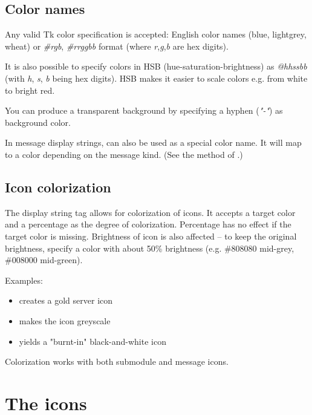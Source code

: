 \subsection{Color names}

Any valid Tk color specification is accepted: English color names
(blue, lightgrey, wheat) or \textit{\#rgb}, \textit{\#rrggbb} format
(where \textit{r},\textit{g},\textit{b} are hex digits).

It is also possible to specify colors in HSB (hue-saturation-brightness) as
\textit{@hhssbb} (with \textit{h}, \textit{s}, \textit{b} being hex digits).
HSB makes it easier to scale colors e.g. from white to bright red.

You can produce a transparent background by specifying a hyphen (\textit{"-"})
as background color.

In message display strings,  can also be used as a special color name.
It will map to a color depending on the message kind.
(See the  method of .)

\subsection{Icon colorization}

The  display string tag allows for colorization of icons.
It accepts a target color and a percentage as the degree of colorization.
Percentage has no effect if the target color is missing.
Brightness of icon is also affected -- to keep the original brightness,
specify a color with about 50\% brightness (e.g. \#808080 mid-grey,
\#008000 mid-green).

Examples:

\begin{itemize}
  \item {} creates a gold server icon
  \item {} makes the icon greyscale
  \item {} yields a "burnt-in" black-and-white icon
\end{itemize}

Colorization works with both submodule and message icons.


\section{The icons}
\label{sec:ch-graphics:icon-library}

